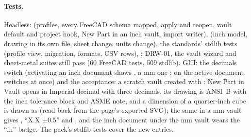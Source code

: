 \paragraph{Tests.} Headless:  (profiles, every FreeCAD schema mapped, apply and
reopen, vault default and project hook, New Part in an inch vault, import writer),
 (inch model, drawing in its own file, sheet change, units change), the standards'
stdlib tests (profile view, migration, formats, CSV rows), ; DRW-01,
the vault wizard and sheet-metal suites still pass (60 FreeCAD tests, 509 stdlib). GUI: the decimals switch
(activating an inch document shows , a mm one ;  on the active
document switches at once) and the acceptance: a scratch vault created with : New Part in Vault
opens in Imperial decimal with three decimals, its drawing is ANSI~B with the inch tolerance block and ASME
note, and a dimension of a quarter-inch cube is drawn as  (read back from the page's exported SVG);
the same in a mm vault gives , ``X.X ±0.5'' and , and the inch document under the mm
vault wears the ``in'' badge. The pack's stdlib tests cover the new entries.

